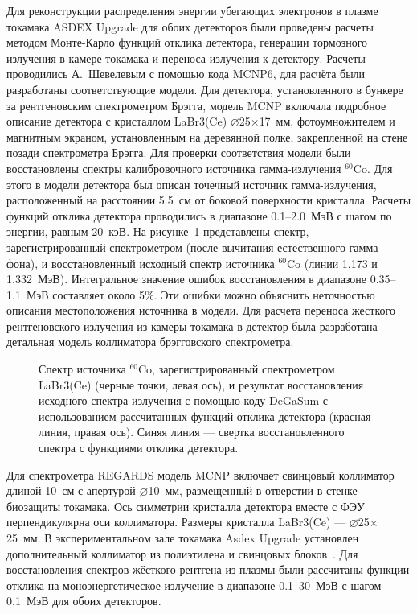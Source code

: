Для реконструкции распределения энергии убегающих электронов в плазме токамака ASDEX Upgrade для обоих детекторов были проведены расчеты методом Монте-Карло функций отклика детектора, генерации тормозного излучения в камере токамака и переноса излучения к детектору. Расчеты проводились А.~Шевелевым с помощью кода MCNP6, для расчёта были разработаны соответствующие модели. Для детектора, установленного в бункере за рентгеновским спектрометром Брэгга, модель MCNP включала подробное описание детектора с кристаллом LaBr3(Ce) $\varnothing$25$\times$17~мм, фотоумножителем и магнитным экраном, установленным на деревянной полке, закрепленной на стене позади спектрометра Брэгга. Для проверки соответствия модели были восстановлены спектры калибровочного источника гамма-излучения ${}^{60}$Co. Для этого в модели детектора был описан точечный источник гамма-излучения, расположенный на расстоянии 5.5~см от боковой поверхности кристалла. Расчеты функций отклика детектора проводились в диапазоне 0.1--2.0~МэВ с шагом по энергии, равным 20~кэВ. На рисунке~\ref{fig:asdex60CoRecostructionBragg} представлены спектр, зарегистрированный спектрометром (после вычитания естественного гамма-фона), и восстановленный исходный спектр источника ${}^{60}$Co (линии 1.173 и 1.332~МэВ). Интегральное значение ошибок восстановления в диапазоне 0.35--1.1~МэВ составляет около 5\%. Эти ошибки можно объяснить неточностью описания местоположения источника в модели. Для расчета переноса жесткого рентгеновского излучения из камеры токамака в детектор была разработана детальная модель коллиматора брэгговского спектрометра.~\cite{Shevelev2021}

\begin{figure}[ht!]
  \caption{ Спектр источника ${}^{60}$Co, зарегистрированный спектрометром LaBr3(Ce) (черные точки, левая ось), и результат восстановления исходного спектра излучения с помощью коду DeGaSum с использованием рассчитанных функций отклика детектора (красная линия, правая ось). Синяя линия --- свертка восстановленного спектра с функциями отклика детектора.~\cite{Shevelev2021} }
  \label{fig:asdex60CoRecostructionBragg}
\end{figure}

Для спектрометра REGARDS модель MCNP включает свинцовый коллиматор длиной 10~см с апертурой $\varnothing$10~мм, размещенный в отверстии в стенке биозащиты токамака. Ось симметрии кристалла детектора вместе с ФЭУ перпендикулярна оси коллиматора. Размеры кристалла LaBr3(Ce) --- $\varnothing$25$\times$25~мм. В экспериментальном зале токамака Asdex Upgrade установлен дополнительный коллиматор из полиэтилена и свинцовых блоков~\cite{Tardini2012}. Для восстановления спектров жёсткого рентгена из плазмы были рассчитаны функции отклика на моноэнергетическое излучение в диапазоне 0.1--30~МэВ с шагом 0.1~МэВ для обоих детекторов.~\cite{Shevelev2021} 

